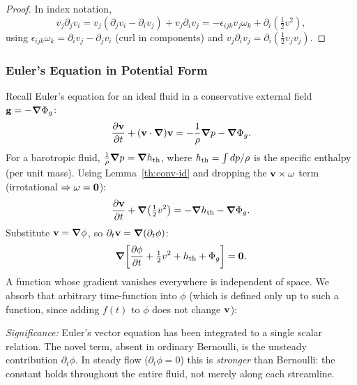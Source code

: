 \documentclass[../main.tex]{subfiles}
\begin{document}
\begin{proof}
In index notation,
\[
  v_j\partial_j v_i = v_j(\partial_j v_i - \partial_i v_j) + v_j\partial_i v_j
  = -\epsilon_{ijk}v_j\omega_k + \partial_i(\tfrac{1}{2}v^2),
\]
using $\epsilon_{ijk}\omega_k=\partial_i v_j-\partial_j v_i$ (curl in components) and $v_j\partial_i v_j=\partial_i(\tfrac{1}{2}v_j v_j)$.
\end{proof}

\subsubsection{Euler's Equation in Potential Form}

Recall Euler's equation for an ideal fluid in a conservative external field $\mathbf{g}=-\grad\Phi_g$:
\begin{equation}
  \pdv{\mathbf{v}}{t} + (\mathbf{v}\cdot\grad)\mathbf{v} = -\frac{1}{\rho}\grad p - \grad\Phi_g.
  \label{eq:lec15_euler}
\end{equation}
For a barotropic fluid, $\tfrac{1}{\rho}\grad p = \grad h_{\rm th}$, where $h_{\rm th}=\int dp/\rho$ is the specific enthalpy (per unit mass). Using Lemma~\ref{th:conv-id} and dropping the $\mathbf{v}\times\mathbf{\omega}$ term (irrotational $\Rightarrow \mathbf{\omega}=\mathbf{0}$):
\begin{equation}
  \pdv{\mathbf{v}}{t} + \grad\!\left(\tfrac{1}{2}v^2\right)
  = -\grad h_{\rm th} - \grad\Phi_g.
  \label{eq:lec15_euler_pot}
\end{equation}
Substitute $\mathbf{v}=\grad\phi$, so $\partial_t\mathbf{v} = \grad(\partial_t\phi)$:
\begin{equation}
  \grad\!\left[\pdv{\phi}{t} + \tfrac{1}{2}v^2 + h_{\rm th} + \Phi_g\right] = \mathbf{0}.
  \label{eq:lec15_grad_zero}
\end{equation}
A function whose gradient vanishes everywhere is independent of space. We absorb that arbitrary time-function into $\phi$ (which is defined only up to such a function, since adding $f(t)$ to $\phi$ does not change $\mathbf{v}$):

\textit{Significance:} Euler's vector equation has been integrated to a single scalar relation. The novel term, absent in ordinary Bernoulli, is the unsteady contribution $\partial_t\phi$. In steady flow ($\partial_t\phi=0$) this is \emph{stronger} than Bernoulli: the constant holds throughout the entire fluid, not merely along each streamline.
\end{document}
